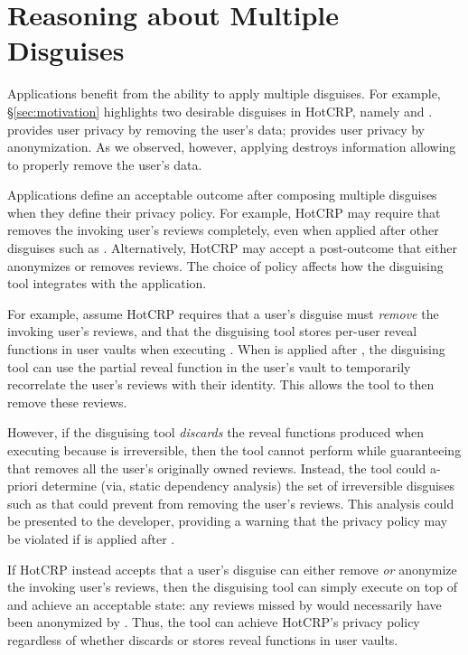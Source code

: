 \section{Reasoning about Multiple Disguises}

Applications benefit from the ability to apply multiple disguises. For example,
\S\ref{sec:motivation} highlights two desirable disguises in HotCRP, namely \gdpr and \ca. \gdpr
provides user privacy by removing the user's data; \ca provides user privacy by anonymization.
As we observed, however, applying \ca destroys information allowing \gdpr to properly remove the
user's data.

Applications define an acceptable outcome after composing multiple disguises when they define their
privacy policy.
For example, HotCRP may require that \gdpr removes the invoking user's reviews completely, even when
applied after other disguises such as \ca.  Alternatively, HotCRP may accept a post-\gdpr outcome that either
anonymizes or removes reviews. 
The choice of policy affects how the disguising tool integrates with the application.

For example, assume HotCRP requires that a user's \gdpr disguise must \emph{remove} the invoking user's reviews,
and that the disguising tool stores per-user reveal functions in user vaults when executing \ca.
When \gdpr is applied after \ca, the disguising tool can use the partial reveal function in the
user's vault to temporarily recorrelate the user's reviews with their identity. This allows the tool
to then remove these reviews.
%

However, if the disguising tool \emph{discards} the reveal functions produced
when executing \ca because \ca is irreversible, then the tool cannot perform \gdpr while guaranteeing that \gdpr removes all the user's originally owned reviews.
Instead, the tool could a-priori determine (via, \eg static dependency analysis) the set of irreversible disguises
such as \ca that could prevent \gdpr from removing the user's reviews. This analysis could be
presented to the developer, providing a warning that the privacy policy may be violated if \gdpr is
applied after \ca.

If HotCRP instead accepts that a user's \gdpr disguise can either remove \emph{or} anonymize the
invoking user's reviews, then the disguising tool can simply execute \gdpr on top of \ca and achieve
an acceptable state: any reviews missed by \gdpr would necessarily have been anonymized by \ca.
Thus, the tool can achieve HotCRP's privacy policy regardless of whether \ca discards or stores
reveal functions in user vaults.
